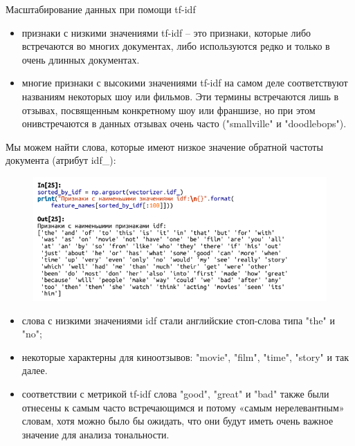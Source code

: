\documentclass{beamer}
\begin{document}
\begin{frame}{Масштабирование данных при помощи tf-idf}
\begin{itemize}
\item признаки с низкими значениями tf-idf – это признаки, которые либо встречаются во многих документах, либо используются редко и только в очень длинных документах. 
\item многие признаки с высокими значениями tf-idf на самом деле соответствуют названиям некоторых шоу или фильмов. Эти термины встречаются лишь в отзывах, посвященным конкретному шоу или франшизе, но при этом онивстречаются в данных отзывах очень часто ("smallville" и "doodlebops").
\end{itemize}
\end{frame}

\begin{frame}
Мы можем найти слова, которые имеют низкое значение обратной частоты документа (атрибут idf\_):
\begin{figure}[h]
\centering
\includegraphics[scale=0.75]{images/lec09-pic25.png}
\end{figure}
\begin{itemize}
\item слова с низкими значениями idf стали английские стоп-слова типа "the" и "no";
\item некоторые характерны для киноотзывов: "movie", "film", "time", "story" и так далее. 
\item соответствии с метрикой tf-idf слова "good", "great" и "bad" также были отнесены к самым часто встречающимся и потому «самым нерелевантным» словам, хотя можно было бы ожидать, что они будут иметь очень важное значение для анализа тональности.
\end{itemize}
\end{frame}
\end{document}
